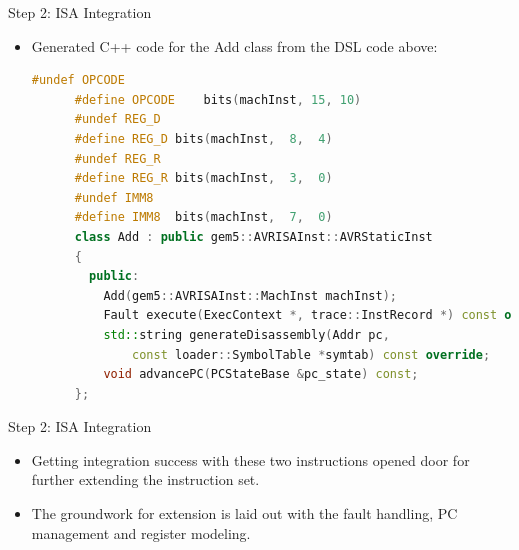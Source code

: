 \begin{frame}[fragile]{Step 2: ISA Integration}
	\begin{itemize}
		\item Generated C++ code for the Add class from the DSL code above:
		      \begin{lstlisting}[language=C++]
      #undef OPCODE
      #define OPCODE	bits(machInst, 15, 10)
      #undef REG_D
      #define REG_D	bits(machInst,  8,  4)
      #undef REG_R
      #define REG_R	bits(machInst,  3,  0)
      #undef IMM8
      #define IMM8	bits(machInst,  7,  0)
      class Add : public gem5::AVRISAInst::AVRStaticInst
      {
        public:
          Add(gem5::AVRISAInst::MachInst machInst);
          Fault execute(ExecContext *, trace::InstRecord *) const override;
          std::string generateDisassembly(Addr pc,
              const loader::SymbolTable *symtab) const override;
          void advancePC(PCStateBase &pc_state) const;
      };
    \end{lstlisting}
	\end{itemize}
\end{frame}


\begin{frame}{Step 2: ISA Integration}
	\begin{itemize}
		\item Getting integration success with these two instructions opened door for further extending the instruction set.
		\item The groundwork for extension is laid out with the fault handling, PC management and register modeling.
	\end{itemize}
\end{frame}